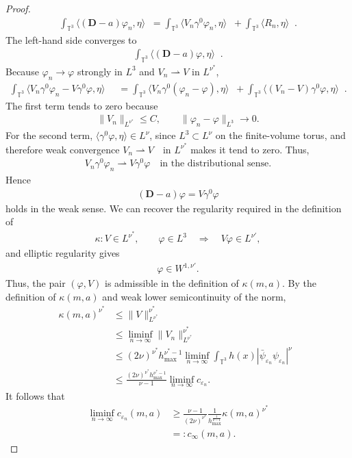 \documentclass[11pt,final]{amsart}
\newcommand{\T}{\mathbb{T}}
\newcommand{\dd}{\mathop{}\!\mathrm{d}}
\newcommand{\eps}{\varepsilon}
\newcommand{\pD}{\mathbf{D}}
\DeclareMathOperator{\dv}{\dd{vol}}
\begin{document}
\begin{proof}
\begin{align}
\int_{\T^3}
\langle(\pD-a)\varphi_n,\eta\rangle\dv=
\int_{\T^3}
\langle V_n\gamma^0\varphi_n,\eta\rangle\dv
+
\int_{\T^3}\langle R_n,\eta\rangle\dv.
\end{align}
The left-hand side converges to
\begin{align}
\int_{\T^3}\langle(\pD-a)\varphi,\eta\rangle\dv.
\end{align}
Because $\varphi_n\to\varphi$ strongly in $L^3$ and $V_n\rightharpoonup V$ in $L^{\nu^*}$,
\begin{align}
\int_{\T^3}
\langle V_n\gamma^0\varphi_n-V\gamma^0\varphi,\eta\rangle\dv&=\int_{\T^3}
\langle V_n\gamma^0(\varphi_n-\varphi),\eta\rangle\dv+\int_{\T^3}
\langle (V_n-V)\gamma^0\varphi,\eta\rangle\dv.
\end{align}
The first term tends to zero because
\begin{align}
\|V_n\|_{L^{\nu^*}}\le C,\qquad
\|\varphi_n-\varphi\|_{L^3}\to0.
\end{align}
For the second term,
$\langle\gamma^0\varphi,\eta\rangle\in L^\nu$,
since $L^3\subset L^\nu$ on the finite-volume torus, and therefore weak convergence
$V_n\rightharpoonup V\quad\text{in }L^{\nu^*}$
makes it tend to zero. Thus,
\begin{align}
V_n\gamma^0\varphi_n
\rightharpoonup
V\gamma^0\varphi\quad \text{in the distributional sense}.
\end{align}
Hence
\begin{align}
(\pD-a)\varphi=V\gamma^0\varphi
\end{align}
holds in the weak sense. We can recover the regularity required in the definition of
\begin{align}
\kappa:
V\in L^{\nu^*},\qquad \varphi\in L^3
\quad\Longrightarrow\quad
V\varphi\in L^{\nu'},
\end{align}
and elliptic regularity gives
\begin{align}
\varphi\in W^{1,\nu'}.
\end{align}
Thus, the pair $(\varphi,V)$ is admissible in the definition of $\kappa(m,a)$. By the definition of $\kappa(m,a)$ and weak lower semicontinuity of the norm,
\begin{align}
\kappa(m,a)^{\nu^*}
&\leq
\|V\|_{L^{\nu^*}}^{\nu^*}\\
&\leq
\liminf_{n\to\infty}
\|V_n\|_{L^{\nu^*}}^{\nu^*}\\
&\leq
(2\nu)^{\nu^*}
h_{\max}^{\nu^*-1}
\liminf_{n\to\infty}
\int_{\T^3}
h(x)|\bar\psi_{\eps_n}\psi_{\eps_n}|^\nu\dv\\
&\leq \frac{(2\nu)^{\nu^*}
h_{\max}^{\nu^*-1}}{\nu-1}\liminf_{n\to\infty}c_{\eps_n}.
\end{align}
It follows that
\begin{align}
\liminf_{n\to\infty}c_{\eps_n}(m,a)
&\geq
\frac{\nu-1}{(2\nu)^{\nu^*}}
\frac{1}{h_{\max}^{\frac{1}{\nu-1}}}
\kappa(m,a)^{\nu^*}\\
&=:c_\infty(m,a).
\end{align}




\end{proof}
\end{document}
